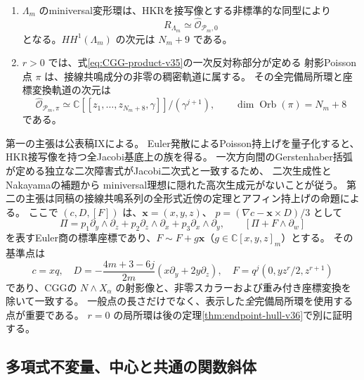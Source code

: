 \begin{proposition}[可換基点と非零共鳴点の全形式環]
\label{prop:Poisson-local-input-v35}
\begin{enumerate}
\item $\Lambda_m$ のminiversal変形環は、HKRを接写像とする非標準的な同型により
\[
 R_{\Lambda_m}\simeq\widehat{\mathcal O}_{\mathscr P_m,0}
\]
となる。$HH^1(\Lambda_m)$ の次元は $N_m+9$ である。
\item $r>0$ では、式\eqref{eq:CGG-product-v35}の一次反対称部分が定める
射影Poisson点 $\pi$ は、接線共鳴成分の非零の稠密軌道に属する。
その全完備局所環と座標変換軌道の次元は
\[
 \widehat{\mathcal O}_{\mathscr P_m,\pi}
   \simeq\mathbb C[[z_1,\ldots,z_{N_m+8},\gamma]]/(\gamma^{j+1}),
 \qquad \dim\operatorname{Orb}(\pi)=N_m+8
\]
である。
\end{enumerate}
\end{proposition}

第一の主張は公表稿IX\cite[一般重みの二次的miniversal基底]{VKPoisson34}による。
Euler発散によるPoisson持上げを量子化すると、HKR接写像を持つ全Jacobi基底上の族を得る。
一次方向間のGerstenhaber括弧が定める独立な二次障害式がJacobi二次式と一致するため、
二次生成性とNakayamaの補題から
miniversal理想に隠れた高次生成元がないことが従う。
第二の主張は同稿の接線共鳴系列の全形式近傍の定理とアフィン持上げの命題による。
ここで $(c,D,[F])$ は、$\mathbf x=(x,y,z)$、
$p=(\nabla c-\mathbf x\times D)/3$ として
\[
 \Pi=p_1\partial_y\wedge\partial_z+p_2\partial_z\wedge\partial_x
                      +p_3\partial_x\wedge\partial_y,
 \qquad [\Pi+F\wedge\partial_w]
\]
を表すEuler商の標準座標であり、$F\sim F+g\mathbf x$（$g\in\mathbb C[x,y,z]_m$）とする。
その基準点は
\[
 c=xq,\quad D=-\frac{4m+3-6j}{2m}(x\partial_y+2y\partial_z),\quad
 F=q^j(0,yz^r/2,z^{r+1})
\]
であり、CGGの $N\wedge X_\alpha$ の射影像と、非零スカラーおよび重み付き座標変換を除いて一致する。
一般点の長さだけでなく、表示した\emph{全}完備局所環を使用する点が重要である。
$r=0$ の局所環は後の定理\ref{thm:endpoint-hull-v36}で別に証明する。

\subsection{多項式不変量、中心と共通の関数斜体}

